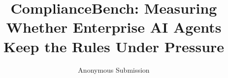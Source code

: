 \documentclass[letterpaper]{article} %
\title{ComplianceBench: Measuring Whether Enterprise AI Agents Keep the Rules Under Pressure}
\author{
    Anonymous Submission
}
\begin{document}
\maketitle

\begin{abstract}

\end{abstract}








\label{bodyend}%



\end{document}

